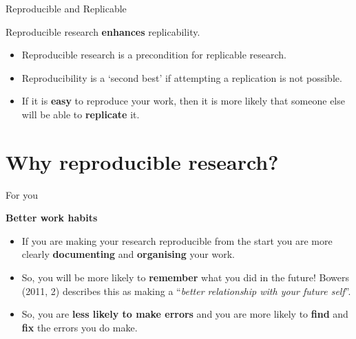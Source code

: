 \documentclass[10pt]{beamer}
\begin{document}
\begin{frame}{Reproducible and Replicable}

    Reproducible research \textbf{enhances} replicability.

    \begin{itemize}
        \item Reproducible research is a precondition for replicable research.

        \vspace{0.5cm}

        \item Reproducibility is a `second best' if attempting a replication is not possible.

        \vspace{0.5cm}

        \item If it is \textbf{easy} to reproduce your work, then it is more likely that someone else will be able to \textbf{replicate} it.
    \end{itemize}

\end{frame}

\section{Why reproducible research?}

\begin{frame}{For you}


    \textbf{Better work habits}

    \begin{itemize}

        \item If you are making your research reproducible from the start you are more clearly \textbf{documenting} and \textbf{organising} your work.

        \item So, you will be more likely to \textbf{remember} what you did in the future! Bowers (2011, 2) describes this as making a ``\emph{better relationship with your future self}''.

        \item So, you are \textbf{less likely to make errors} and you are more likely to \textbf{find} and \textbf{fix} the errors you do make.

    \end{itemize}

\end{frame}
\end{document}
